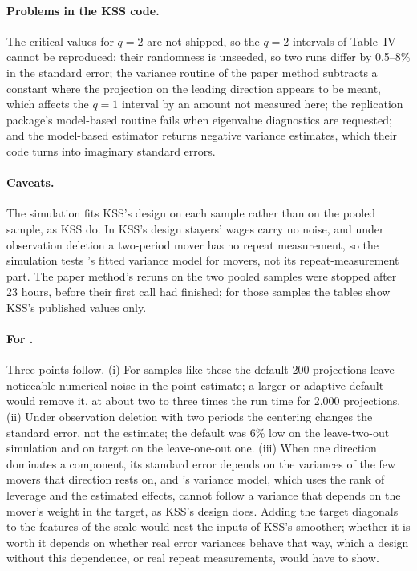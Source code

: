\paragraph{Problems in the KSS code.} The critical values for $q=2$ are not shipped, so the $q=2$ intervals of
Table~IV cannot be reproduced; their randomness is unseeded, so two runs differ by 0.5--8\% in the standard error;
the variance routine of the paper method subtracts a constant where the projection on the leading direction
appears to be meant, which affects the $q=1$ interval by an amount not measured here; the replication package's
model-based routine fails when eigenvalue diagnostics are requested; and the model-based estimator returns
negative variance estimates, which their code turns into imaginary standard errors.

\paragraph{Caveats.} The simulation fits KSS's design on each sample rather than on the pooled sample, as KSS do.
In KSS's design stayers' wages carry no noise, and under observation deletion a two-period mover has no repeat
measurement, so the simulation tests \fevc's fitted variance model for movers, not its repeat-measurement part. The
paper method's reruns on the two pooled samples were stopped after 23 hours, before their first call had finished;
for those samples the tables show KSS's published values only.

\paragraph{For \fevc.} Three points follow. (i) For samples like these the default 200 projections leave
noticeable numerical noise in the point estimate; a larger or adaptive default would remove it, at about two to
three times the run time for 2{,}000 projections.
(ii) Under observation deletion with two periods the centering changes the standard error, not the estimate; the
default was 6\% low on the leave-two-out simulation and on target on the leave-one-out one. (iii) When one
direction dominates a component, its standard error depends on the variances of the few movers that direction
rests on, and \fevc's variance model, which uses the rank of leverage and the estimated effects, cannot follow a
variance that depends on the mover's weight in the target, as KSS's design does. Adding the target diagonals to the
features of the scale would nest the inputs of KSS's smoother; whether it is worth it depends on whether real error
variances behave that way, which a design without this dependence, or real repeat measurements, would have to show.
